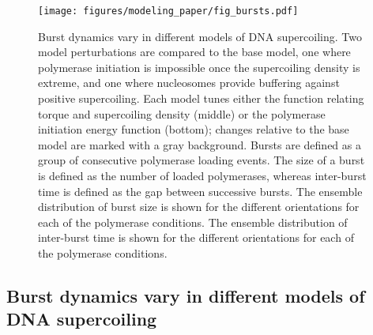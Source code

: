 \documentclass[11pt]{article} %
\begin{document}
\begin{figure}[htbp]
    \centering
    {\texttt{[image: figures/modeling\_paper/fig\_bursts.pdf]}
    \label{fig:perturbation_overview}
    \label{fig:burst_time_cartoon}
    \label{fig:burst_size_dynamics}
    \label{fig:interburst_time_dynamics}
    }
    \caption{Burst dynamics vary in different models of DNA supercoiling.
         Two model perturbations are compared to the base model, one where polymerase initiation is impossible once the supercoiling density is extreme, and one where nucleosomes provide buffering against positive supercoiling. Each model tunes either the function relating torque and supercoiling density (middle) or the polymerase initiation energy function (bottom); changes relative to the base model are marked with a gray background.
         Bursts are defined as a group of consecutive polymerase loading events. The size of a burst is defined as the number of loaded polymerases, whereas inter-burst time is defined as the gap between successive bursts.
         The ensemble distribution of burst size is shown for the different orientations for each of the polymerase conditions.
         The ensemble distribution of inter-burst time is shown for the different orientations for each of the polymerase conditions.
    }
    \label{fig:top:bursts}
\end{figure}

\subsection{Burst dynamics vary in different models of DNA supercoiling }
\end{document}
